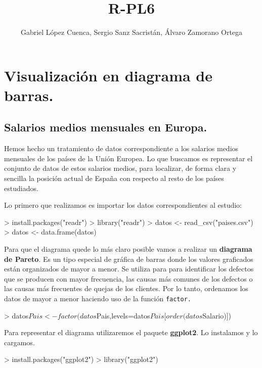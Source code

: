 \documentclass [a4paper] {article}
\title{R-PL6}
\author{Gabriel López Cuenca, Sergio Sanz Sacristán, Álvaro Zamorano Ortega}
\begin{document}


\maketitle

\graphicspath{ {./tmp/} }

\section{Visualización en diagrama de barras.}

\subsection{Salarios medios mensuales en Europa.}
\bigskip
Hemos hecho un tratamiento de datos correspondiente a los salarios medios mensuales de los países de la Unión Europea.
Lo que buscamos es representar el conjunto de datos de estos salarios medios, para localizar, de forma clara
y sencilla la posición actual de España con respecto al resto de los países estudiados.

\bigskip
Lo primero que realizamos es importar los datos correspondientes al estudio:
\begin{Schunk}
\begin{Sinput}
> install.packages("readr")
> library("readr")
> datos <- read_csv("paises.csv")
> datos <- data.frame(datos)
\end{Sinput}
\end{Schunk}

\bigskip
Para que el diagrama quede lo más claro posible vamos a realizar un \textbf{diagrama de Pareto}. Es un tipo 
especial de gráfica de barras donde los valores graficados están organizados de mayor a 
menor. Se utiliza para para identificar los defectos que se producen con mayor frecuencia, las causas más 
comunes de los defectos o las causas más frecuentes de quejas de los clientes. Por lo tanto, ordenamos los
datos de mayor a menor haciendo uso de la función \texttt{factor.}
\begin{Schunk}
\begin{Sinput}
> datos$Pais <- factor(datos$Pais,levels=datos$Pais[order(datos$Salario)])
\end{Sinput}
\end{Schunk}

\bigskip
Para representar el diagrama utilizaremos el paquete \textbf{ggplot2}. Lo instalamos y lo cargamos.
\begin{Schunk}
\begin{Sinput}
> install.packages("ggplot2")
> library("ggplot2")
\end{Sinput}
\end{Schunk}
\end{document}
